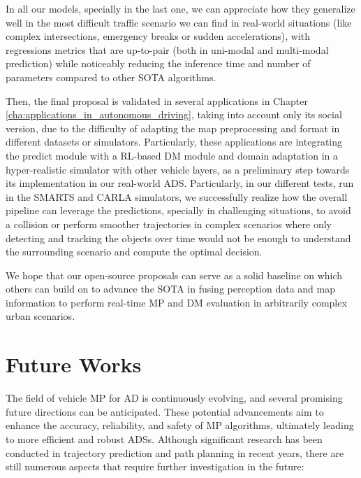 In all our models, specially in the last one, we can appreciate how they generalize well in the most difficult traffic scenario we can find in real-world situations (like complex intersections, emergency breaks or sudden accelerations), with regressions metrics that are up-to-pair (both in uni-modal and multi-modal prediction) while noticeably reducing the inference time and number of parameters compared to other \ac{SOTA} algorithms.

Then, the final proposal is validated in several applications in Chapter \ref{cha:applications_in_autonomous_driving}, taking into account only its social version, due to the difficulty of adapting the map preprocessing and format in different datasets or simulators. Particularly, these applications are integrating the predict module with a \acf{RL}-based \acf{DM} module and domain adaptation in a hyper-realistic simulator with other vehicle layers, as a preliminary step towards its implementation in our real-world \acf{ADS}. Particularly, in our different tests, run in the \ac{SMARTS} and \ac{CARLA} simulators, we successfully realize how the overall pipeline can leverage the predictions, specially in challenging situations, to avoid a collision or perform smoother trajectories in complex scenarios where only detecting and tracking the objects over time would not be enough to understand the surrounding scenario and compute the optimal decision.

We hope that our open-source proposals can serve as a solid baseline on which others can build on to advance the \acf{SOTA} in fusing perception data and map information to perform real-time \acf{MP} and \acf{DM} evaluation in arbitrarily complex urban scenarios. 

\section{Future Works}
\label{sec:9_future_works}

The field of vehicle \acf{MP} for \acf{AD} is continuously evolving, and several promising future directions can be anticipated. These potential advancements aim to enhance the accuracy, reliability, and safety of \ac{MP} algorithms, ultimately leading to more efficient and robust \acfp{ADS}. Although significant research has been conducted in trajectory prediction and path planning in recent years, there are still numerous aspects that require further investigation in the future:

